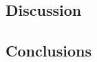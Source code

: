 \documentclass[journal=jacsat,manuscript=article,layout=singlecolumn]{achemso}
\begin{document}
\clearpage

\subsection{Discussion}

\subsection{Conclusions}

\begin{acknowledgement}


\end{acknowledgement}

\begin{suppinfo}
\end{suppinfo}


\end{document}
